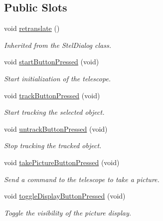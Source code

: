 \subsection*{Public Slots}
\begin{DoxyCompactItemize}
\item 
void \mbox{\hyperlink{class_autoscope_window_form_a3f3d731c45d104fee58dd4c2dcc6fd86}{retranslate}} ()
\begin{DoxyCompactList}\small\item\em Inherited from the Stel\+Dialog class. \end{DoxyCompactList}\item 
void \mbox{\hyperlink{class_autoscope_window_form_ac6b0a28c17efb188b234ce1c08baa82d}{start\+Button\+Pressed}} (void)
\begin{DoxyCompactList}\small\item\em Start initialization of the telescope. \end{DoxyCompactList}\item 
void \mbox{\hyperlink{class_autoscope_window_form_ad7b04807a37c5014ab3a151d2ce720b7}{track\+Button\+Pressed}} (void)
\begin{DoxyCompactList}\small\item\em Start tracking the selected object. \end{DoxyCompactList}\item 
void \mbox{\hyperlink{class_autoscope_window_form_a867b2e9355138f8b41c17dba563c43ef}{untrack\+Button\+Pressed}} (void)
\begin{DoxyCompactList}\small\item\em Stop tracking the tracked object. \end{DoxyCompactList}\item 
void \mbox{\hyperlink{class_autoscope_window_form_ac78048dc833bd4952108cb5fe8cac6f8}{take\+Picture\+Button\+Pressed}} (void)
\begin{DoxyCompactList}\small\item\em Send a command to the telescope to take a picture. \end{DoxyCompactList}\item 
void \mbox{\hyperlink{class_autoscope_window_form_ae7caa21b226f06d2f32fd6da6d539bbf}{toggle\+Display\+Button\+Pressed}} (void)
\begin{DoxyCompactList}\small\item\em Toggle the visibility of the picture display. \end{DoxyCompactList}\end{DoxyCompactItemize}
